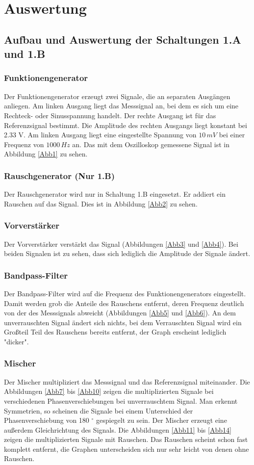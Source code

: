 \documentclass[11pt]{article}
\begin{document}
\section{Auswertung}
\subsection{Aufbau und Auswertung der Schaltungen 1.A und 1.B}
\subsubsection{Funktionengenerator}
Der Funktionengenerator erzeugt zwei Signale, die an separaten Ausgängen anliegen. Am linken Ausgang liegt das Messsignal an, bei dem es sich um eine Rechteck- oder Sinusspannung handelt. Der rechte Ausgang ist für das Referenzsignal bestimmt. Die Amplitude des rechten Ausgangs liegt konstant bei 2.33 V. Am linken Ausgang liegt eine eingestellte Spannung von $10 \, mV$ bei einer Frequenz von $1000 \, Hz$ an. Das mit dem Oszilloskop gemessene Signal ist in Abbildung \ref{Abb1} zu sehen.
\subsubsection{Rauschgenerator (Nur 1.B)}
Der Rauschgenerator wird nur in Schaltung 1.B eingesetzt. Er addiert ein Rauschen auf das Signal. Dies ist in Abbildung \ref{Abb2} zu sehen. 
\subsubsection{Vorverstärker}
Der Vorverstärker verstärkt das Signal (Abbildungen \ref{Abb3} und \ref{Abb4}). Bei beiden Signalen ist zu sehen, dass sich lediglich die Amplitude der Signale ändert.
\subsubsection{Bandpass-Filter}
Der Bandpass-Filter wird auf die Frequenz des Funktionengenerators eingestellt. Damit werden grob die Anteile des Rauschens entfernt, deren Frequenz deutlich von der des Messsignals abweicht (Abbildungen \ref{Abb5} und \ref{Abb6}). An dem unverrauschten Signal ändert sich nichts, bei dem Verrauschten Signal wird ein Großteil Teil des Rauschens bereits entfernt, der Graph erscheint lediglich "dicker".
\subsubsection{Mischer}
Der Mischer multipliziert das Messsignal und das Referenzsignal miteinander.  Die Abbildungen \ref{Abb7} bis \ref{Abb10} zeigen die multiplizierten Signale bei verschiedenen Phasenverschiebungen bei unverrauschtem Signal. Man erkennt Symmetrien, so scheinen die Signale bei einem Unterschied der Phasenverschiebung von 180 $^\circ$ gespiegelt zu sein. Der Mischer erzeugt eine außerdem Gleichrichtung des Signals. Die Abbildungen \ref{Abb11} bis \ref{Abb14} zeigen die multiplizierten Signale mit Rauschen. Das Rauschen scheint schon fast komplett entfernt, die Graphen unterscheiden sich nur sehr leicht von denen ohne Rauschen.
\end{document}
